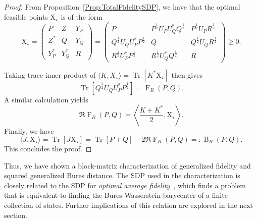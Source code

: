 \documentclass[12pt]{article}
\theoremstyle{definition}
\begin{document}
\begin{proof}
    From Proposition~\ref{Prop:TotalFidelitySDP}, we have that the optimal feasible points $\mathrm{X}_\star$ is of the form
   \begin{equation}
        \mathrm{X}_\star = \begin{pmatrix}
        P & Z & Y_P \\
        Z^* & Q & Y_Q \\
        Y_P^* & Y_Q^* & R 
    \end{pmatrix} = 
    \begin{pmatrix}
    P & P^{\frac12} U_P U_Q^* Q^{\frac12} & P^{\frac12} U_P R^{\frac12} \\
    Q^{\frac12} U_Q U_P^* P^{\frac12} & Q & Q^{\frac12} U_Q R^{\frac12} \\
    R^{\frac12} U_P^* P^{\frac12} & R^{\frac12} U_Q^* Q^{\frac12} & R 
    \end{pmatrix} \geq 0.
    \end{equation}

Taking trace-inner product of $\langle K, X_\star \rangle = \operatorname{Tr}[K^*\mathrm{X}_\star]$ then gives
\begin{equation}
    \operatorname{Tr}\left[Q^{\frac12} U_Q U_P^* P ^{\frac12}\right] = \operatorname{F}_R(P,Q).
\end{equation}
A similar calculation yields 
\begin{equation}
\Re \operatorname{F}_R(P,Q) = \left\langle \frac{K + K^*}2, \mathrm{X}_\star \right\rangle. 
\end{equation}
Finally, we have
\begin{equation}
    \langle J, \mathrm{X}_\star \rangle = \operatorname{Tr}[J \mathrm{X}_\star] = \operatorname{Tr}[P+Q] - 2 \Re \operatorname{F}_R(P,Q) =: \operatorname{B}_R(P,Q). 
\end{equation}
This concludes the proof.
\end{proof}

Thus, we have shown a block-matrix characterization of generalized fidelity and squared generalized Bures distance. The SDP used in the characterization is closely related to the SDP for \textit{optimal average fidelity}~\cite{afham2022}, which finds a problem that is equivalent to finding the Bures-Wasserstein barycenter of a finite collection of states. Further implications of this relation are explored in the next section.
\end{document}
